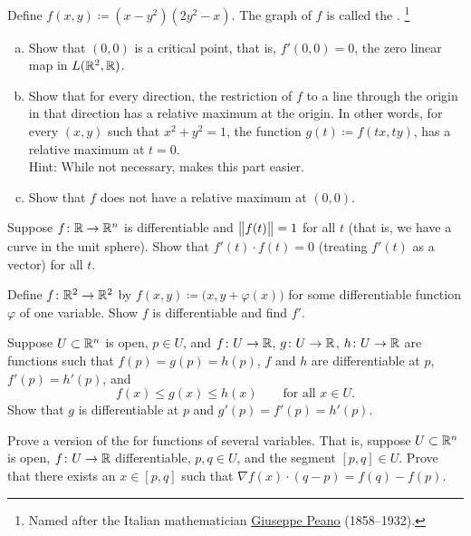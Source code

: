 \begin{exercise} \label{exercise:peano}
Define $f(x,y) \coloneqq ( x-y^2 ) ( 2 y^2 - x)$.  The graph of $f$ is called
the \emph{}.%
\footnote{Named after the Italian mathematician
\href{https://en.wikipedia.org/wiki/Giuseppe_Peano}{Giuseppe Peano}
(1858--1932).}
\begin{enumerate}[a)]
\item
Show that
$(0,0)$ is a critical point, that is, $f'(0,0) = 0$, the zero
linear map in $L({\mathbb{R}}^2,{\mathbb{R}})$.
\item
Show that for every direction, the restriction of $f$ to a line through the origin
in that direction has a relative maximum at the origin.  In other words,
for every $(x,y)$ such that $x^2+y^2=1$, the function $g(t) \coloneqq f(tx,ty)$,
has a relative maximum at $t=0$.\\
Hint: While not necessary,
makes
this part easier.
\item
Show that $f$ does not have a relative maximum at $(0,0)$.
\end{enumerate}
\end{exercise}

\begin{exercise}
Suppose $f \colon {\mathbb{R}} \to {\mathbb{R}}^n$ is differentiable and $\bigl\lVert {f(t)} \bigr\rVert = 1$ for
all $t$ (that is, we have a curve in the unit sphere).  Show that 
$f'(t) \cdot f(t) = 0$ (treating $f'(t)$ as a vector) for all $t$.
\end{exercise}

\begin{exercise}
Define $f \colon {\mathbb{R}}^2 \to {\mathbb{R}}^2$ by $f(x,y) \coloneqq
\bigl(x,y+\varphi(x)\bigr)$ for some differentiable function $\varphi$ of one
variable.  Show $f$ is differentiable and find $f'$.
\end{exercise}

\begin{exercise}
Suppose $U \subset {\mathbb{R}}^n$ is open, $p \in U$, and
$f \colon U \to {\mathbb{R}}$,
$g \colon U \to {\mathbb{R}}$,
$h \colon U \to {\mathbb{R}}$ are functions such that
$f(p) = g(p) = h(p)$, $f$ and $h$ are differentiable at $p$,
$f'(p) = h'(p)$, and
\begin{equation*}
f(x) \leq g(x) \leq h(x) \qquad \text{for all } x \in U .
\end{equation*}
Show that $g$ is differentiable at $p$ and 
$g'(p) = f'(p) = h'(p)$.
\end{exercise}

\begin{exercise}
Prove a version of the \emph{}
for functions of several variables.  That is, suppose $U \subset {\mathbb{R}}^n$
is open, $f \colon U \to {\mathbb{R}}$ differentiable, $p,q \in U$, and the segment
$[p,q] \in U$.  Prove that there exists an $x \in [p,q]$ such that
$\nabla f (x) \cdot (q-p) = f(q)-f(p)$.
\end{exercise}

